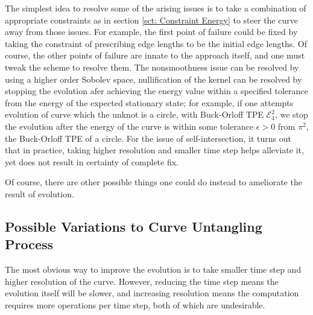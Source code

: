 \documentclass[../dissertation.tex]{subfiles}
\begin{document}
The simplest idea to resolve some of the arising issues is to take a combination of appropriate constraints as in section \ref{sct: Constraint Energy} to steer the curve away from those issues.
For example, the first point of failure could be fixed by taking the constraint of prescribing edge lengths to be the initial edge lengths. 
Of course, the other points of failure are innate to the approach itself,
and one must tweak the scheme to resolve them.
The nonsmoothness issue can be resolved by using a higher order Sobolev space,
nullification of the kernel can be resolved by stopping the evolution afer achieving the energy value within a specified tolerance from the energy of the expected stationary state;
for example, if one attempts evolution of curve which the unknot is a circle, with Buck-Orloff TPE $\mathcal{E}_{4}^{2}$, we stop the evolution after the energy of the curve is within some tolerance $\epsilon > 0$ from $\pi^2$,
the Buck-Orloff TPE of a circle.
For the issue of self-intersection,
it turns out that in practice, taking higher resolution and smaller time step helps alleviate it,
yet does not result in certainty of complete fix.

Of course, there are other possible things one could do instead to ameliorate the result of evolution.

\subsection{Possible Variations to Curve Untangling Process}
The most obvious way to improve the evolution is to take smaller time step and higher resolution of the curve.
However, reducing the time step means the evolution itself will be slower,
and increasing resolution means the computation requires more operations per time step,
both of which are undesirable.
\end{document}
